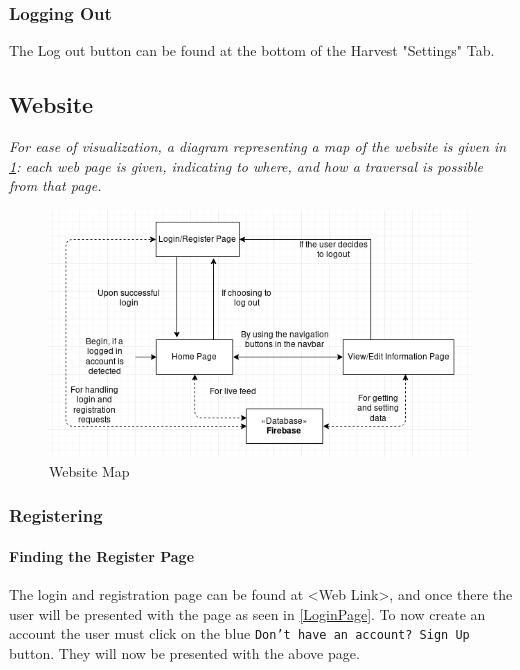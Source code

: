\documentclass[11pt]{article}
\begin{document}
\subsubsection{Logging Out}
The Log out button can be found at the bottom of the Harvest "Settings" Tab.

\subsection{Website}



\textit{For ease of visualization, a diagram representing a map of the website is given in \ref{WebsiteMap}: each web page is given, indicating to where, and how a traversal is possible from that page.}

\begin{figure}[h]
 \centering
 \includegraphics[width=12cm, keepaspectratio]{Images/webDiagramMap.png}
 \caption{Website Map}
 \label{WebsiteMap}
\end{figure}

\subsubsection{Registering}
\paragraph{Finding the Register Page}The login and registration page can be found at <Web Link>, and once there the user will be presented with the page as seen in \ref{LoginPage}. To now create an account the user must click on the blue \texttt{Don't have an account? Sign Up} button. They will now be presented with the above page.
\end{document}
